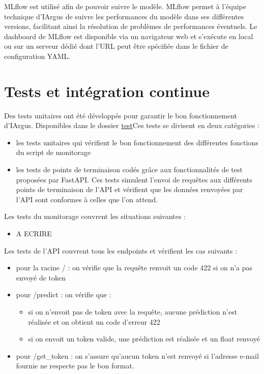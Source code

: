 \documentclass[french]{article}
\begin{document}
    MLflow est utilisé afin de pouvoir suivre le modèle. MLflow permet à l'équipe technique d'IArgus de suivre les performances du modèle dans ses différentes versions, facilitant ainsi la résolution de problèmes de performances éventuels. Le dashboard de MLflow est disponible via un navigateur web et s'exécute en local ou sur un serveur dédié dont l'URL peut être spécifiée dans le fichier de configuration YAML.

    \section{Tests et intégration continue}

    Des tests unitaires ont été développés pour garantir le bon fonctionnement d'IArgus. Disponibles dans le dossier \href{https://github.com/vinpap/iargus/tree/08493c829a37590847164a2f695db763736b9e35/iargus/test}{test}Ces tests se divisent en deux catégories :
    \begin{itemize}
        \item les tests unitaires qui vérifient le bon fonctionnement des différentes fonctions du script de monitorage
        \item les tests de points de terminaison codés grâce aux fonctionnalités de test proposées par FastAPI. Ces tests simulent l'envoi de requêtes aux différents points de terminaison de l'API et vérifient que les données renvoyées par l'API sont conformes à celles que l'on attend.
    \end{itemize}

    Les tests du monitorage couvrent les situations suivantes :
    \begin{itemize}
        \item {A ECRIRE}
    \end{itemize}

    Les tests de l'API couvrent tous les endpoints et vérifient les cas suivants :
    \begin{itemize}
        \item pour la racine / : on vérifie que la requête renvoit un code 422 si on n'a pas envoyé de token
        \item pour /predict : on vérifie que :
        \begin{itemize}
            \item si on n'envoit pas de token avec la requête, aucune prédiction n'est réalisée et on obtient un code d'erreur 422
            \item si on envoit un token valide, une prédiction est réalisée et un float renvoyé
        \end{itemize}
        \item pour /get\_token : on s'assure qu'aucun token n'est renvoyé si l'adresse e-mail fournie ne respecte pas le bon format.
    \end{itemize}
\end{document}
